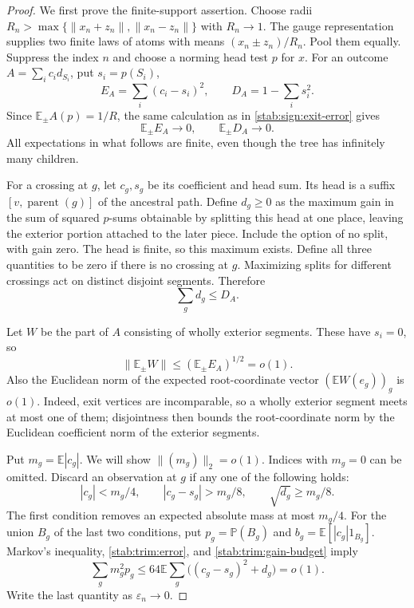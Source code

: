 \begin{proof}
We first prove the finite-support assertion. Choose radii
$R_n>\max\{\|x_n+z_n\|,\|x_n-z_n\|\}$ with $R_n\to1$.
The gauge representation supplies two finite laws of atoms with
means $(x_n\pm z_n)/R_n$. Pool them equally. Suppress the index
$n$ and choose a norming head test $p$ for $x$.
For an outcome $A=\sum_i c_id_{S_i}$, put $s_i=p(S_i)$,
\[
 E_A=\sum_i(c_i-s_i)^2,\qquad D_A=1-\sum_i s_i^2.
\]
Since $\mathbb E_\pm A(p)=1/R$, the same calculation as in
\eqref{stab:sign:exit-error} gives
\begin{equation}\label{stab:trim:error}
 \mathbb E_\pm E_A\longrightarrow0,\qquad
 \mathbb E_\pm D_A\longrightarrow0.
\end{equation}
All expectations in what follows are finite, even though the tree
has infinitely many children.

For a crossing at $g$, let $c_g,s_g$ be its coefficient and head
sum. Its head is a suffix $[v,\operatorname{parent}(g)]$ of the
ancestral path. Define $d_g\ge0$ as the maximum gain in the sum of
squared $p$-sums obtainable by splitting this head at one place,
leaving the exterior portion attached to the later piece. Include
the option of no split, with gain zero. The head is finite, so this
maximum exists. Define all three quantities to be zero if there is
no crossing at $g$. Maximizing splits for different crossings act
on distinct disjoint segments. Therefore
\begin{equation}\label{stab:trim:gain-budget}
 \sum_gd_g\le D_A.
\end{equation}

Let $W$ be the part of $A$ consisting of wholly exterior segments.
These have $s_i=0$, so
\begin{equation}\label{stab:trim:exterior}
 \|\mathbb E_\pm W\|\le(\mathbb E_\pm E_A)^{1/2}=o(1).
\end{equation}
Also the Euclidean norm of the expected root-coordinate vector
$(\mathbb EW(e_g))_g$ is $o(1)$. Indeed, exit vertices are
incomparable, so a wholly exterior segment meets at most one of
them; disjointness then bounds the root-coordinate norm by the
Euclidean coefficient norm of the exterior segments.

Put $m_g=\mathbb E|c_g|$. We will show $\|(m_g)\|_2=o(1)$.
Indices with $m_g=0$ can be omitted. Discard an observation at $g$
if any one of the following holds:
\begin{equation}\label{stab:trim:tests}
 |c_g|<m_g/4,\qquad
 |c_g-s_g|>m_g/8,\qquad
 \sqrt{d_g}\ge m_g/8.
\end{equation}
The first condition removes an expected absolute mass at most
$m_g/4$. For the union $B_g$ of the last two conditions, put
$p_g=\mathbb P(B_g)$ and $b_g=\mathbb E[|c_g|1_{B_g}]$.
Markov's inequality, \eqref{stab:trim:error}, and
\eqref{stab:trim:gain-budget} imply
\begin{equation}\label{stab:trim:bad-probability}
 \sum_gm_g^2p_g
 \le64\mathbb E\sum_g\big((c_g-s_g)^2+d_g\big)=o(1).
\end{equation}
Write the last quantity as $\varepsilon_n\to0$.


\end{proof}
